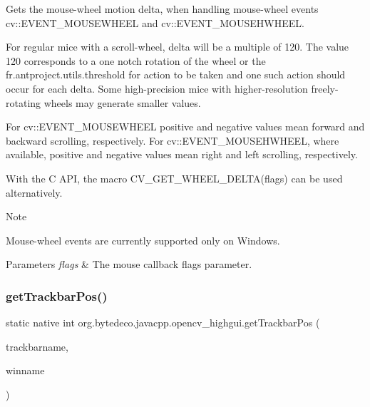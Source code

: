 Gets the mouse-\/wheel motion delta, when handling mouse-\/wheel events cv\+::\+E\+V\+E\+N\+T\+\_\+\+M\+O\+U\+S\+E\+W\+H\+E\+EL and cv\+::\+E\+V\+E\+N\+T\+\_\+\+M\+O\+U\+S\+E\+H\+W\+H\+E\+EL. 

For regular mice with a scroll-\/wheel, delta will be a multiple of 120. The value 120 corresponds to a one notch rotation of the wheel or the fr.antproject.utils.threshold for action to be taken and one such action should occur for each delta. Some high-\/precision mice with higher-\/resolution freely-\/rotating wheels may generate smaller values.

For cv\+::\+E\+V\+E\+N\+T\+\_\+\+M\+O\+U\+S\+E\+W\+H\+E\+EL positive and negative values mean forward and backward scrolling, respectively. For cv\+::\+E\+V\+E\+N\+T\+\_\+\+M\+O\+U\+S\+E\+H\+W\+H\+E\+EL, where available, positive and negative values mean right and left scrolling, respectively. 

With the C A\+PI, the macro C\+V\+\_\+\+G\+E\+T\+\_\+\+W\+H\+E\+E\+L\+\_\+\+D\+E\+L\+T\+A(flags) can be used alternatively. 

\begin{DoxyNote}{Note}

\end{DoxyNote}
Mouse-\/wheel events are currently supported only on Windows. 


\begin{DoxyParams}{Parameters}
{\em flags} & The mouse callback flags parameter. \\
\hline
\end{DoxyParams}
\mbox{\label{group__highgui_gad91f649b98c33cbfdbf3c995935facdc}} 
\subsubsection{\texorpdfstring{get\+Trackbar\+Pos()}{getTrackbarPos()}}
{\footnotesize\ttfamily static native int org.\+bytedeco.\+javacpp.\+opencv\+\_\+highgui.\+get\+Trackbar\+Pos (\begin{DoxyParamCaption}\item[{@Str Byte\+Pointer}]{trackbarname,  }\item[{@Str Byte\+Pointer}]{winname }\end{DoxyParamCaption})\hspace{0.3cm}{\ttfamily [static]}}



